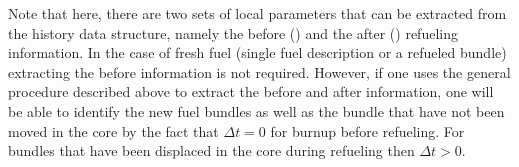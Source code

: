 Note that here, there are two sets of local parameters that can be extracted from the history data structure, namely 
the before () and the after () refueling information. In the case of fresh fuel (single fuel description 
or a refueled bundle) extracting the before information is not required. However, if one uses the general procedure 
described above to extract the before and after information, one will be able to identify the new fuel bundles as 
well as the bundle that have not been moved in the core by the fact that $\Delta t = 0$ for burnup before refueling. For 
bundles that have been displaced in the core during refueling then $\Delta t > 0$.

\clearpage
